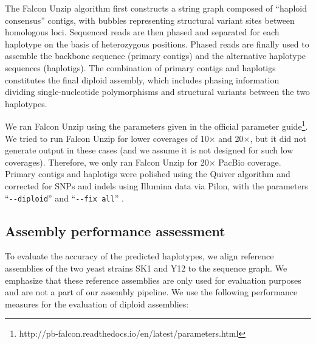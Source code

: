 The Falcon Unzip \citep{chin2016phased} algorithm first constructs a string graph composed of ``haploid consensus'' contigs, with bubbles representing structural variant sites between homologous loci. 
Sequenced reads are then phased and separated for each haplotype on the basis of heterozygous positions. 
Phased reads are finally used to assemble the backbone sequence (primary contigs) and the alternative haplotype sequences (haplotigs). 
The combination of primary contigs and haplotigs constitutes the final diploid assembly, which includes phasing information dividing single-nucleotide polymorphisms and structural variants between the two haplotypes.

We ran Falcon Unzip using the parameters given in the official parameter guide\footnote{http://pb-falcon.readthedocs.io/en/latest/parameters.html}.
We tried to run Falcon Unzip for lower coverages of 10$\times$ and 20$\times$, but it did not generate output in these cases (and we assume it is not designed for such low coverages).
Therefore, we only ran Falcon Unzip for 20$\times$ PacBio coverage.
Primary contigs and haplotigs were polished using the Quiver algorithm and corrected for SNPs and indels using Illumina data via Pilon, with the parameters ``\texttt{{-}{-}diploid}'' and ``\texttt{{-}{-}fix all}'' \citep{walker2014pilon}.

\subsection{Assembly performance assessment}
To evaluate the accuracy of the predicted haplotypes, we align reference assemblies of the two yeast strains SK1 and Y12 \citep{yue2017contrasting} to the sequence graph.
We emphasize that these reference assemblies are only used for evaluation purposes and are not a part of our assembly pipeline.
We use the following performance measures for the evaluation of diploid assemblies:

